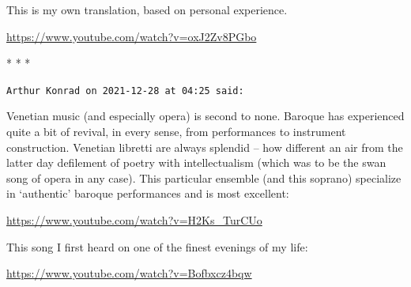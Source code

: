 This is my own translation, based on personal experience.

\url{https://www.youtube.com/watch?v=oxJ2Zv8PGbo} 


\begin{center}* * *\end{center}

\begin{footnotesize}
\begin{sffamily}
\texttt{Arthur Konrad on 2021-12-28 at 04:25 said:}

Venetian music (and especially opera) is second to none. Baroque has experienced quite a bit of revival, in every sense, from performances to instrument construction. Venetian libretti are always splendid -- how different an air from the latter day defilement of poetry with intellectualism (which was to be the swan song of opera in any case). This particular ensemble (and this soprano) specialize in `authentic' baroque performances and is most excellent:

\url{https://www.youtube.com/watch?v=H2Ks_TurCUo}


This song I first heard on one of the finest evenings of my life:

\url{https://www.youtube.com/watch?v=Bofbxcz4bqw}

\hfill

\end{sffamily}
\end{footnotesize}

